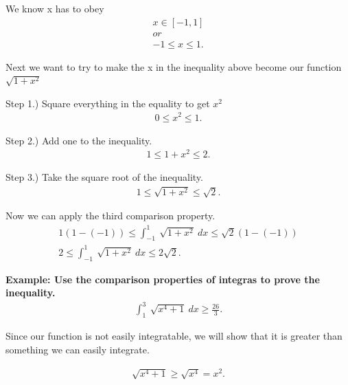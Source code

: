 \documentclass{report}
\begin{document}
\bigbreak \noindent \bigbreak \noindent
We know x has to obey
\begin{align*}
  x \in [-1,1] \\
  or \\
  -1 \leq x \leq 1
.\end{align*}

\bigbreak \noindent \bigbreak \noindent
Next we want to try to make the x in the inequality above become our function $\sqrt{1+x^{2}}$

\bigbreak \noindent \bigbreak \noindent
Step 1.) Square everything in the equality to get $x^{2}$
\begin{align*}
  0 \leq x^{2} \leq 1
.\end{align*}


\bigbreak \noindent \bigbreak \noindent
Step 2.) Add one to the inequality.
\begin{align*}
  1 \leq 1+ x^{2} \leq 2
.\end{align*}

\bigbreak \noindent \bigbreak \noindent 
Step 3.) Take the square root of the inequality.
\begin{align*}
  1 \leq \sqrt{1+x^{2}} \leq \sqrt{2}
.\end{align*}

\bigbreak \noindent \bigbreak \noindent
Now we can apply the third comparison property.
\begin{align*}
  1(1-(-1)) \leq \int_{-1}^{1}\ \sqrt{1+x^{2}}\ dx \leq \sqrt{2}(1-(-1)) \\
  2 \leq \int_{-1}^{1}\ \sqrt{1+x^{2}}\ dx \leq 2\sqrt{2}
.\end{align*}

\pagebreak \bigbreak \noindent
\bigbreak \noindent 
\begin{mdframed}
  \textbf{Example: Use the comparison properties of integras to prove the inequality.}
  \begin{align*}
    \int_{1}^{3}\ \sqrt{x^{4} + 1}\ dx \geq \frac{26}{3} 
  .\end{align*}
\end{mdframed}

\bigbreak \noindent \bigbreak \noindent
Since our function is not easily integratable, we will show that it is greater than something we can easily integrate.

\begin{align*}
  \sqrt{x^{4} +1} \geq \sqrt{x^{4}} = x^{2}
.\end{align*}
\end{document}
